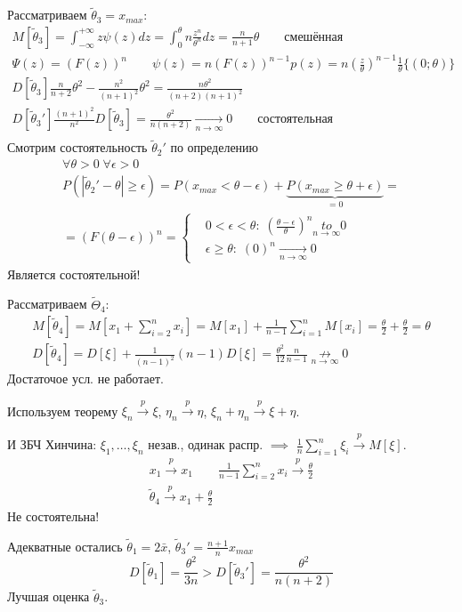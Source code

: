 \documentclass{article}
\begin{document}
\begin{problem}[Т1]
  Рассматриваем $\tilde\theta_3=x_{max}$:
  \begin{gather*}
    M[\tilde\theta_3]=\int_{-\infty}^{+\infty}z\psi(z)dz=\int_{0}^{\theta}n\frac{z^{n}}{\theta^{n}}dz=\frac{n}{n+1}\theta \qquad \text{смешённая}\\
    \Psi(z)=(F(z))^{n} \qquad \psi(z)=n(F(z))^{n-1}p(z)=n\left(\frac{z}{\theta}\right)^{n-1}\frac{1}{\theta} \{(0;\theta)\} \\
    D[\tilde\theta_3]\frac{n}{n+2}\theta^{2}-\frac{n^{2}}{(n+1)^{2}}\theta^{2}=\frac{n\theta^{2}}{(n+2)(n+1)^{2}} \\ 
    D[\tilde\theta_3']\frac{(n+1)^{2}}{n^{2}}D[\tilde\theta_3]=\frac{\theta^{2}}{n(n+2)} \underset{n\to\infty}{\to} 0 \qquad \text{состоятельная} \\
  \end{gather*}
  Смотрим состоятельность $\tilde\theta_2'$ по определению
  \begin{gather*}
    \forall\theta>0 \; \forall \epsilon > 0 \\ 
    P(|\tilde\theta_2'-\theta|\ge\epsilon)=P(x_{max}<\theta-\epsilon) + \underbrace{P(x_{max}\ge\theta+\epsilon)}_{=0}= \\ 
    =(F(\theta-\epsilon))^{n}=\left\{\begin{aligned}
      & 0<\epsilon<\theta: \; \left(\frac{\theta-\epsilon}{\theta}\right)^{n}\underset{n\to\infty}{to} 0 \\ 
      & \epsilon \ge \theta: \; (0)^{n} \underset{n\to\infty}{\to} 0 
    \end{aligned}\right.
  \end{gather*}
  Является состоятельной!


  Рассматриваем $\tilde\Theta_4$:
  \begin{gather*}
    M[\tilde\theta_4]=M[x_1+\sum_{i=2}^{n}x_i]=
    M[x_1]+\frac{1}{n-1}\sum_{i=1}^{n}M[x_i] =\frac{\theta}{2}+\frac{\theta}{2}=\theta \\ 
    D[\tilde \theta_4]=D[\xi]+\frac{1}{(n-1)^{2}}(n-1)D[\xi]=\frac{\theta^{2}}{12}\frac{n}{n-1} \underset{n\to\infty}{\not \to} 0
  \end{gather*}
  Достаточое усл. не работает.

  Используем теорему $\xi_n \overset{p}{\to} \xi$, $\eta_n \overset{p}{\to}\eta$, $\xi_n+\eta_n \overset{p}{\to}\xi+\eta$.

  И ЗБЧ Хинчина: $\xi_1,\dots ,\xi_n$ незав., одинак распр. $\implies$ $\frac{1}{n}\sum_{i=1}^{n}\xi_i \overset{p}{\to} M[\xi]$.
  \begin{gather*}
    x_1 \overset{p}{\to} x_1 \qquad \frac{1}{n-1}\sum_{i=2}^{n}x_i \overset{p}{\to} \frac{\theta}{2} \\ 
    \tilde \theta_4 \overset{p}{\to} x_1 + \frac{\theta}{2}
  \end{gather*}
  Не состоятельна!
 
  Адекватные остались $\tilde\theta_1=2 \bar x$, $\tilde\theta_3'=\frac{n+1}{n}x_{max}$
  \[
    D[\tilde\theta_1]=\frac{\theta^{2}}{3n} > D[\tilde{\theta}_3']=\frac{\theta^{2}}{n(n+2)}
  \]
  Лучшая оценка $\tilde{\theta}_3$.
\end{problem}
\hr
\end{document}
